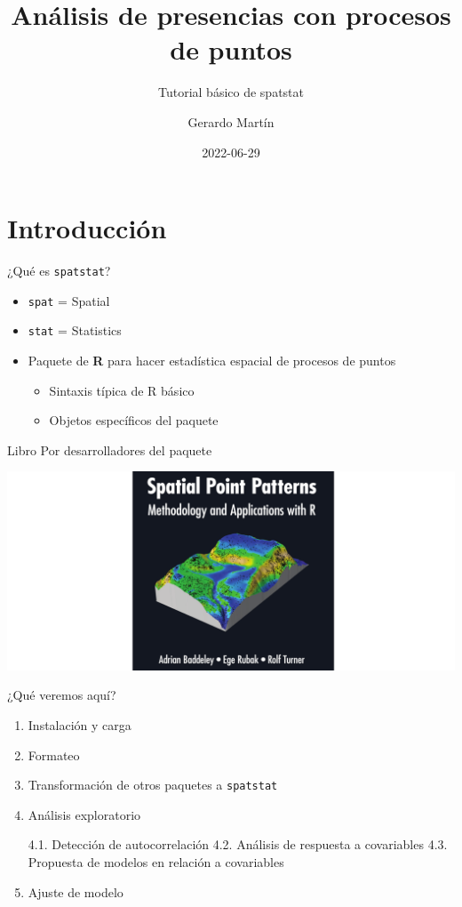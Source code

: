 \documentclass[
  11pt,
  ignorenonframetext,
]{beamer}
\title{Análisis de presencias con procesos de puntos}
\subtitle{Tutorial básico de spatstat}
\author{Gerardo Martín}
\date{2022-06-29}
\providecommand{\tightlist}{%
  \setlength{\itemsep}{0pt}\setlength{\parskip}{0pt}}
\begin{document}
\frame{\titlepage}

\hypertarget{introducciuxf3n}{%
\section{Introducción}\label{introducciuxf3n}}

\begin{frame}[fragile]{¿Qué es \texttt{spatstat}?}
\protect\hypertarget{quuxe9-es-spatstat}{}
\begin{itemize}
\item
  \texttt{spat} = Spatial
\item
  \texttt{stat} = Statistics
\item
  Paquete de \textbf{R} para hacer estadística espacial de procesos de
  puntos

  \begin{itemize}
  \tightlist
  \item
    Sintaxis típica de R básico
  \item
    Objetos específicos del paquete
  \end{itemize}
\end{itemize}
\end{frame}

\begin{frame}{Libro}
\protect\hypertarget{libro}{}
Por desarrolladores del paquete

\includegraphics{Figuras/Spat-book.png}
\end{frame}

\begin{frame}[fragile]{¿Qué veremos aquí?}
\protect\hypertarget{quuxe9-veremos-aquuxed}{}
\begin{enumerate}
\item
  Instalación y carga
\item
  Formateo
\item
  Transformación de otros paquetes a \texttt{spatstat}
\item
  Análisis exploratorio

  4.1. Detección de autocorrelación 4.2. Análisis de respuesta a
  covariables 4.3. Propuesta de modelos en relación a covariables
\item
  Ajuste de modelo
\end{enumerate}
\end{frame}
\end{document}
